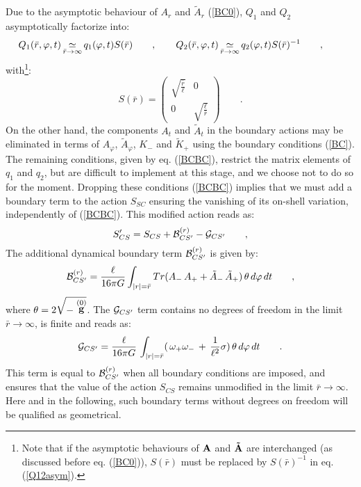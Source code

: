 \documentclass[a4paper,10pt]{article}
\begin{document}
Due to the asymptotic behaviour of $A_r$ and $\tilde A_r$ (\ref{BC0}),  
$Q_1$ and $Q_2$ asymptotically factorize into: 
\begin{equation} 
\label{Q12asym} 
Q_1(\bar r,\varphi,t)\mathop {\simeq} \limits_{\bar r \rightarrow \infty} 
q_1(\varphi,t) S(\bar r) \qquad , \qquad 
Q_2(\bar r,\varphi,t)\mathop {\simeq} \limits_{\bar r \rightarrow \infty} 
q_2(\varphi,t) S(\bar r)^{-1} \qquad , \qquad 
\end{equation} 
with\footnote{Note that if the asymptotic behaviours of 
$\bf A$ and $\bf \tilde A$ are interchanged (as discussed 
before eq. (\ref{BC0})), $S(\bar r)$ must
be replaced by $S(\bar r)^{-1}$ in eq. (\ref{Q12asym}).}:
\begin{equation} \label{ExpreS}
S(\bar r) = \left(\begin{array}{cc}  
 \sqrt{\frac {\bar r} \ell}  &  0 \\ 
  0   &   \sqrt{\frac \ell {\bar r}} 
  \end{array}\right) \qquad . 
\end{equation} 
On the other hand, the components $A_t$ and $\tilde A_t$ in the boundary 
actions may be eliminated in terms of $A_\varphi$, $\tilde A_\varphi$, 
$K_{-}$ and $\tilde K_{+}$ using the boundary conditions (\ref{BC}).
The remaining conditions, given by eq. (\ref{BCBC}), 
restrict the matrix elements of $q_1$ and $q_2$, but are difficult to 
implement at this stage, and we choose not to do so for the  
moment. Dropping these conditions (\ref{BCBC}) implies that we  
must add a boundary  
term to the action $S_{SC}$ 
ensuring the vanishing of its on-shell variation, independently 
of (\ref{BCBC}). This modified action reads as: 
\begin{equation} 
\label{SPRCS} 
S^\prime_{CS}=S_{CS} + {\cal B}_{CS'}^{(r)} - {\cal G}_{CS'} \qquad , 
\end{equation} 
The additional dynamical boundary term ${\cal B}_{CS'}^{(r)}$  
is given by: 
\begin{equation} 
{\cal B}_{CS'}^{(r)} 
=  \frac {\ell} {16 \pi G} \int_{|r|=\bar r}   
Tr (  A_{-} \,  A_{+} + \tilde A_{-} \,  \tilde A_{+}) \,  
\theta \, d\varphi\, dt  \qquad ,
\end{equation} 
where  
$\theta= 2 \sqrt {- \stackrel {(0)} {\bf g} } $.
The ${\cal G}_{CS'}$ term contains no degrees of 
freedom in the limit $\bar r \rightarrow \infty$, 
is finite and reads as: 
\begin{equation} 
\label{GCS} 
{\cal G}_{CS'} = \frac {\ell} {16 \pi G}\,\int_{|r|=\bar r}  
  (\, \omega_{+}\omega_{-}  
 \, + \, 
 \frac 1 {\ell^2} \sigma ) \, \theta \, d\varphi\, dt \qquad . 
\end{equation} 
This term is equal to ${\cal B}_{CS'}^{(r)}$ when all  
boundary conditions are imposed, and ensures that the value of the action $S_{CS}$ 
remains unmodified in the limit 
$\bar r \rightarrow \infty$. 
Here and in the following, such boundary terms without degrees on freedom 
will be qualified as geometrical. 
   
\end{document}
